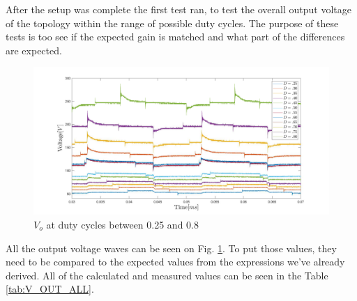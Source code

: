 After the setup was complete the first test ran, to test the overall output voltage of the topology within the range of possible duty cycles.
The purpose of these tests is too see if the expected gain is matched and what part of the differences are expected.
\vspace{-4mm}

\begin{figure}[H]
	\begin{center}
   \includegraphics[width=\textwidth]{figures/06Testing/Vripple10Vin.pdf}
	\end{center}
	\vspace{-8mm}
	\caption{$V_o$ at duty cycles between 0.25 and 0.8}
	\label{fig:V_OUT_ALL}
\end{figure}
\vspace{-4mm}
All the output voltage waves can be seen on Fig. \ref{fig:V_OUT_ALL}. To put those values, they need to be compared to the expected values from the expressions we've already derived. All of the calculated and measured values can be seen in the Table \ref{tab:V_OUT_ALL}.
\vspace{-2mm}

